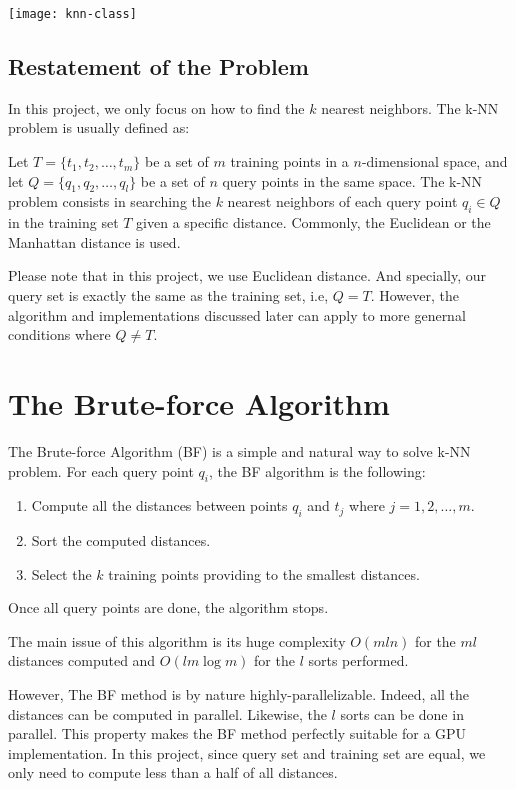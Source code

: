 \documentclass[11pt, a4paper]{article}
\makeatletter
\newcommand\fcaption{\def\@captype{figure}\caption}
\makeatother
\begin{document}
\begin{center}
    \texttt{[image: knn-class]}
    \fcaption{An example of k-NN based classification}\label{knn}
\end{center}

\subsection{Restatement of the Problem}

In this project, we only focus on how to find the $k$ nearest neighbors. The k-NN problem is usually defined as:

Let $T = \{t_1,t_2, \ldots ,t_m\}$ be a set of $m$ training points in a $n$-dimensional space, and let $Q = \{q_1,q_2, \ldots, q_l\}$ be a set of $n$ query points in the same space. The k-NN problem consists in searching the $k$ nearest neighbors of each query point $q_i \in Q$ in the training set $T$ given a specific distance. Commonly, the Euclidean or the Manhattan distance is used.

Please note that in this project, we use Euclidean distance. And specially, our query set is exactly the same as the training set, i.e, $Q=T$. However, the algorithm and implementations discussed later can apply to more genernal conditions where $Q \not= T$.

\section{The Brute-force Algorithm}

The Brute-force Algorithm (BF) is a simple and natural way to solve k-NN problem. For each query point $q_i$, the BF algorithm is the following: 

\begin{enumerate}
    \item Compute all the distances between points $q_i$ and $t_j$ where $j = 1,2,\ldots, m$.
    \item Sort the computed distances.
    \item Select the $k$ training points providing to the smallest distances.
\end{enumerate}

Once all query points are done, the algorithm stops.

The main issue of this algorithm is its huge complexity $O(mln)$ for the $ml$ distances computed and $O(lm \log m)$ for the $l$ sorts performed. 

However, The BF method is by nature highly-parallelizable. Indeed, all the distances can be computed in parallel. Likewise, the $l$ sorts can be done in parallel. This property makes the BF method perfectly suitable for a GPU implementation. In this project, since query set and training set are equal, we only need to compute less than a half of all distances.
\end{document}
